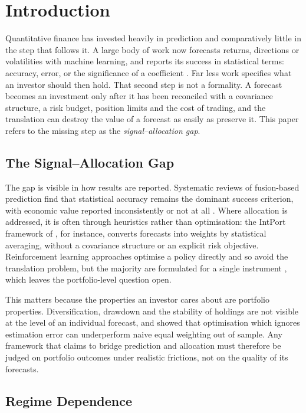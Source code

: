 \section{Introduction}
\label{sec:intro}

Quantitative finance has invested heavily in prediction and comparatively little in the
step that follows it. A large body of work now forecasts returns, directions or
volatilities with machine learning, and reports its success in statistical terms:
accuracy, error, or the significance of a coefficient \citep{gu20, zhang22}. Far less
work specifies what an investor should then hold. That second step is not a
formality. A forecast becomes an investment only after it has been reconciled with a
covariance structure, a risk budget, position limits and the cost of trading, and the
translation can destroy the value of a forecast as easily as preserve it. This paper
refers to the missing step as the \emph{signal--allocation gap}.

\subsection{The Signal--Allocation Gap}

The gap is visible in how results are reported. Systematic reviews of fusion-based
prediction find that statistical accuracy remains the dominant success criterion, with
economic value reported inconsistently or not at all \citep{zhang22}. Where allocation
is addressed, it is often through heuristics rather than optimisation: the IntPort
framework of \citet{sami25}, for instance, converts forecasts into weights by
statistical averaging, without a covariance structure or an explicit risk objective.
Reinforcement learning approaches optimise a policy directly and so avoid the
translation problem, but the majority are formulated for a single instrument
\citep{saijai26, jiang25}, which leaves the portfolio-level question open.

This matters because the properties an investor cares about are portfolio properties.
Diversification, drawdown and the stability of holdings are not visible at the level of
an individual forecast, and \citet{demiguel09} showed that optimisation which ignores
estimation error can underperform naive equal weighting out of sample. Any framework
that claims to bridge prediction and allocation must therefore be judged on portfolio
outcomes under realistic frictions, not on the quality of its forecasts.

\subsection{Regime Dependence}

